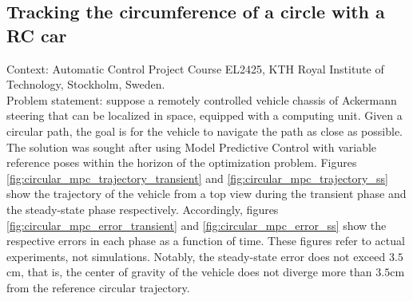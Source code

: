 \subsection{Tracking the circumference of a circle with a RC car}

Context: Automatic Control Project Course EL2425, KTH Royal Institute of
Technology, Stockholm, Sweden.\\

Problem statement: suppose a remotely controlled vehicle chassis of Ackermann
steering that can be localized in space, equipped with a computing unit. Given a
circular path, the goal is for the vehicle to navigate the path as close as
possible. The solution was sought after using Model Predictive Control with
variable reference poses within the horizon of the optimization problem.
Figures \ref{fig:circular_mpc_trajectory_transient} and
\ref{fig:circular_mpc_trajectory_ss} show the trajectory of the vehicle from
a top view during the transient phase and the steady-state phase respectively.
Accordingly, figures \ref{fig:circular_mpc_error_transient} and
\ref{fig:circular_mpc_error_ss} show the respective errors in each phase as
a function of time. These figures refer to actual experiments, not simulations.
Notably, the steady-state error does not exceed $3.5$cm, that is, the center
of gravity of the vehicle does not diverge more than $3.5$cm from the reference
circular trajectory.


\noindent{}

